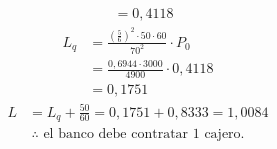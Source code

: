 \documentclass{templateNote}
\begin{document}
{\begin{align*}
        &= 0,4118
    \end{align*}
    \begin{align*}
        L_q &= \frac{\left(\frac{5}{6}\right)^2 \cdot 50 \cdot 60}{70^2} \cdot P_0 \\
        &= \frac{0,6944 \cdot 3000}{4900} \cdot 0,4118 \\
        &= 0,1751
    \end{align*}
    \begin{align*}
        L &= L_q + \frac{50}{60} = 0,1751 + 0,8333 = 1,0084
    \end{align*}
    \begin{align*}
        \therefore \text{ el banco debe contratar 1 cajero.}
    \end{align*}
}
\end{document}
